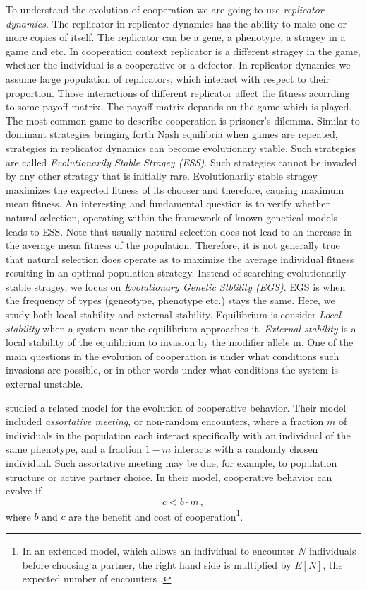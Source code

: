 \documentclass[12pt]{extarticle}
\begin{document}
To understand the evolution of cooperation we are going to use \emph{replicator dynamics}. The replicator in replicator dynamics has the ability to make one or more copies of itself.
The replicator can be a gene, a phenotype, a stragey in a game and etc. In cooperation context replicator is a different stragey in the game, whether the individual is a cooperative or a defector.
In replicator dynamics we assume large population of replicators, which interact with respect to their proportion.
Those interactions of different replicator affect the fitness acorrding to some payoff matrix. The payoff matrix depands on the game which is played. 
The most common game to describe cooperation is prisoner's dilemma\citep{nowak1992tit}.
Similar to dominant strategies bringing forth Nash equilibria when games are repeated, strategies in replicator dynamics can become evolutionary stable. Such strategies are called \emph{Evolutionarily Stable Stragey (ESS)}.
Such strategies cannot be invaded by any other strategy that is initially rare. Evolutionarily stable stragey maximizes the expected fitness of its chooser and therefore, causing maximum mean fitness.
An interesting and fundamental question is to verify whether natural selection, operating within the framework of known genetical models leads to ESS.
Note that usually natural selection does not lead to an increase in the average mean fitness of the population. Therefore, it is not generally true that natural selection does operate as to maximize the average individual fitness resulting in an optimal population strategy.
Instead of searching evolutionarily stable stragey, we focus on \emph{Evolutionary Genetic Stblility (EGS)}\citep{lessard1990evolutionary}. EGS is when the frequency of types (geneotype, phenotype etc.) stays the same.
Here, we study both local stability and external stability. Equilibrium is consider \emph{Local stability} when a system near the equilibrium approaches it.
\emph{External stability} is a  local stability of the equilibrium to invasion by the modifier allele m. One of the main questions in the evolution of cooperation is under what conditions such invasions are possible, or in other words under what conditions the system is external unstable.


\citet{Eshel1982} studied a related model for the evolution of cooperative behavior.
Their model included \emph{assortative meeting}, or non-random encounters, where a fraction $m$ of individuals in the population each interact specifically with an individual of the same phenotype, and a fraction $1-m$ interacts  with a randomly chosen individual.  
Such assortative meeting may be due, for example, to population structure or active partner choice.
In their model, cooperative behavior can evolve if
\citep[eq.~3.2]{Eshel1982}
\begin{equation} \label{eq:eshel1982}
c < b \cdot m \,,
\end{equation}
where $b$ and $c$ are the benefit and cost of cooperation\footnote{In an extended model, which allows an individual to encounter $N$ individuals before choosing a partner, the right hand side is multiplied by $E[N]$, the expected number of encounters \citep[eq.~4.6]{Eshel1982}.
}. 
\end{document}
